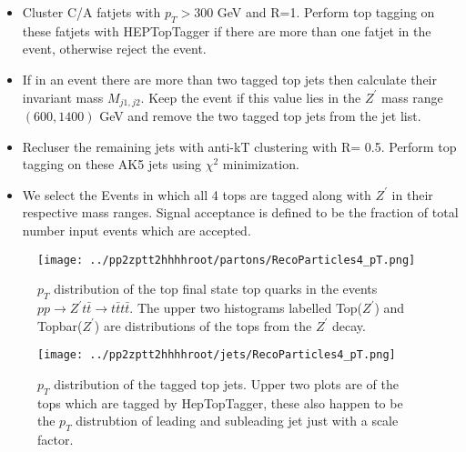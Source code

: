 \documentclass[12pt,a4paper]{article}		%
\begin{document}
\begin{itemize}
	\item Cluster C/A fatjets with $p_T > 300$ GeV and R=1. Perform top tagging on these fatjets with HEPTopTagger if there are more than one fatjet in the event, otherwise reject the event. 
	\item If in an event there are more than two tagged top jets then calculate their invariant mass $M_{j1,j2}$. Keep the event if this value lies in the $Z^\prime$ mass range $(600,1400)$ GeV and remove the two tagged top jets from the jet list.  
	\item Recluser the remaining jets with anti-kT clustering with R= 0.5. Perform top tagging on these AK5 jets using $\chi^2$ minimization.
	\item We select the Events in which all 4 tops are tagged along with $Z^\prime$ in their respective mass ranges. Signal acceptance is defined to be the fraction of total number input events which are accepted.       	
\end{itemize}


\begin{figure}[h]
	\begin{centering}	
		\texttt{[image: ../pp2zptt2hhhhroot/partons/RecoParticles4\_pT.png]} 
		\caption{ $p_T$ distribution of the top final state top quarks in the events $p p \to Z^\prime t \bar{t} \to  t \bar{t}  t \bar{t} $. The upper two histograms labelled Top($Z^\prime$) and Topbar($Z^\prime$) are distributions of the tops from the $Z^\prime$ decay.}
		\label{ttttpt}
		\centering
	\end{centering} 		
\end{figure} 

\newpage

\begin{figure}[h]
	\begin{centering}	
		\texttt{[image: ../pp2zptt2hhhhroot/jets/RecoParticles4\_pT.png]} 
		\caption{ $p_T$ distribution of the tagged top jets.  Upper two plots are of the tops which are tagged by HepTopTagger, these also happen to be the $p_T$ distrubtion of leading and subleading jet just with a scale factor.  }
		\label{ttttpt_reco}
		\centering
	\end{centering} 		
\end{figure} 
\end{document}

